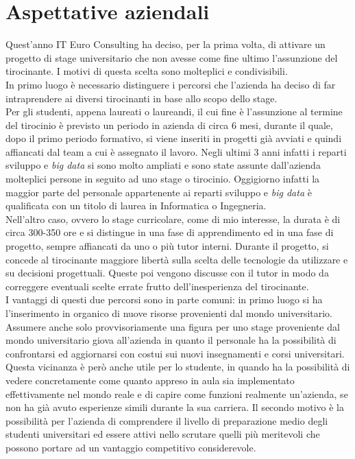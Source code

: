 \section{Aspettative aziendali}
Quest'anno IT Euro Consulting ha deciso, per la prima volta, di attivare un progetto di stage universitario che non avesse come fine ultimo l'assunzione del tirocinante. I motivi di questa scelta sono molteplici e condivisibili. \\
In primo luogo è necessario distinguere i percorsi che l'azienda ha deciso di far intraprendere ai diversi tirocinanti in base allo scopo dello stage. \\ 
Per gli studenti, appena laureati o laureandi, il cui fine è l'assunzione al termine del tirocinio è previsto un periodo in azienda di circa 6 mesi, durante il quale, dopo il primo periodo formativo, si viene inseriti in progetti già avviati e quindi affiancati dal team a cui è assegnato il lavoro. Negli ultimi 3 anni infatti i reparti sviluppo e \textit{big data} si sono molto ampliati e sono state assunte dall'azienda molteplici persone in seguito ad uno stage o tirocinio. Oggigiorno infatti la maggior parte del personale appartenente ai reparti sviluppo e \textit{big data} è qualificata con un titolo di laurea in Informatica o Ingegneria. \\
Nell'altro caso, ovvero lo stage curricolare, come di mio interesse, la durata è di circa 300-350 ore e si distingue in una fase di apprendimento ed in una fase di progetto, sempre affiancati da uno o più tutor interni. Durante il progetto, si concede al tirocinante maggiore libertà sulla scelta delle tecnologie da utilizzare e su decisioni progettuali. Queste poi vengono discusse con il tutor in modo da correggere eventuali scelte errate frutto dell'inesperienza del tirocinante. \\
I vantaggi di questi due percorsi sono in parte comuni: in primo luogo si ha l'inserimento in organico di nuove risorse provenienti dal mondo universitario. Assumere anche solo provvisoriamente una figura per uno stage proveniente dal mondo universitario giova all'azienda in quanto il personale ha la possibilità di confrontarsi ed aggiornarsi con costui sui nuovi insegnamenti e corsi universitari. Questa vicinanza è però anche utile per lo studente, in quando ha la possibilità di vedere concretamente come quanto appreso in aula sia implementato effettivamente nel mondo reale e di capire come funzioni realmente un'azienda, se non ha già avuto esperienze simili durante la sua carriera.
Il secondo motivo è la possibilità per l'azienda di comprendere il livello di preparazione medio degli studenti universitari ed essere attivi nello scrutare quelli più meritevoli che possono portare ad un vantaggio competitivo considerevole.
